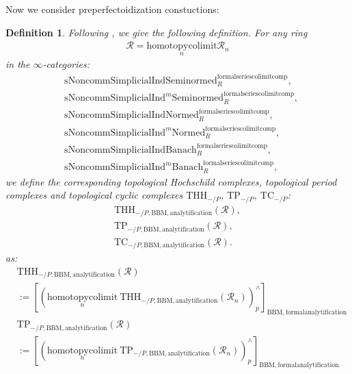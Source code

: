 \documentclass[12pt]{book}
\newtheorem{definition}{Definition}
\begin{document}
\indent Now we consider preperfectoidization constuctions:

\begin{definition}
Following \cite{BS}, we give the following definition. For any ring
\begin{align}
\mathcal{R}=\underset{n}{\mathrm{homotopycolimit}}\mathcal{R}_n	
\end{align}
in the $\infty$-categories:
\begin{align}
&\mathrm{sNoncomm}\mathrm{Simplicial}\mathrm{Ind}\mathrm{Seminormed}^\mathrm{formalseriescolimitcomp}_R,\\
&\mathrm{sNoncomm}\mathrm{Simplicial}\mathrm{Ind}^m\mathrm{Seminormed}^\mathrm{formalseriescolimitcomp}_R,\\
&\mathrm{sNoncomm}\mathrm{Simplicial}\mathrm{Ind}\mathrm{Normed}^\mathrm{formalseriescolimitcomp}_R,\\
&\mathrm{sNoncomm}\mathrm{Simplicial}\mathrm{Ind}^m\mathrm{Normed}^\mathrm{formalseriescolimitcomp}_R,\\
&\mathrm{sNoncomm}\mathrm{Simplicial}\mathrm{Ind}\mathrm{Banach}^\mathrm{formalseriescolimitcomp}_R,\\
&\mathrm{sNoncomm}\mathrm{Simplicial}\mathrm{Ind}^m\mathrm{Banach}^\mathrm{formalseriescolimitcomp}_R,	
\end{align}	
we define the corresponding topological Hochschild complexes, topological period complexes and topological cyclic complexes $\mathrm{THH}_{-/P}$, $\mathrm{TP}_{-/P}$, $\mathrm{TC}_{-/P}$:
\begin{align}
 \mathrm{THH}_{-/P,\mathrm{BBM},\mathrm{analytification}}(\mathcal{R}),\\
 \mathrm{TP}_{-/P,\mathrm{BBM},\mathrm{analytification}}(\mathcal{R}),\\
 \mathrm{TC}_{-/P,\mathrm{BBM},\mathrm{analytification}}(\mathcal{R}). 
\end{align}
as:
\begin{align}
& \mathrm{THH}_{-/P,\mathrm{BBM},\mathrm{analytification}}(\mathcal{R})\\
&:=[(\underset{n}{\mathrm{homotopycolimit}}~  \mathrm{THH}_{-/P,\mathrm{BBM},\mathrm{analytification}}(\mathcal{R}_n))^\wedge_{p}]_{\mathrm{BBM},\mathrm{formalanalytification}}\\
& \mathrm{TP}_{-/P,\mathrm{BBM},\mathrm{analytification}}(\mathcal{R})\\
&:=[(\underset{n}{\mathrm{homotopycolimit}}~  \mathrm{TP}_{-/P,\mathrm{BBM},\mathrm{analytification}}(\mathcal{R}_n))^\wedge_{p}]_{\mathrm{BBM},\mathrm{formalanalytification}}\\

\end{align}
\end{definition}
\end{document}
